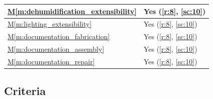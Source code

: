 \documentclass{../tex/report}
\newcommand{\mref}[1]{\hyperref[#1]{M\ref{#1}}}
\begin{document}
\begin{tabular}{|l|p{14.35cm}|}
    \mref{m:dehumidification_extensibility} & Yes                                                               \hfill (\ref{r:8}, \ref{sc:10})                         \\ \hline
    \mref{m:lighting_extensibility}          & Yes                                                               \hfill (\ref{r:8}, \ref{sc:10})                         \\ \hline
    \mref{m:documentation_fabrication}       & Yes                                                               \hfill (\ref{r:8}, \ref{sc:10})                         \\ \hline
    \mref{m:documentation_assembly}          & Yes                                                               \hfill (\ref{r:8}, \ref{sc:10})                         \\ \hline
    \mref{m:documentation_repair}            & Yes                                                               \hfill (\ref{r:8}, \ref{sc:10})                         \\ \hline
\end{tabular}

\subsection{Criteria}
\label{sec:criteria}
\end{document}
